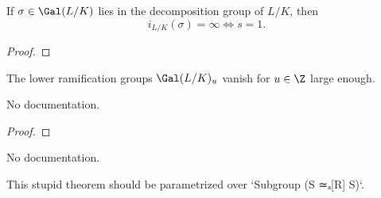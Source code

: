 \begin{theorem}
    \label{lowerIndex_ne_one}

\end{theorem}

\begin{theorem}
    \label{lowerIndex_eq_top_iff_eq_refl}
    \leanok
    If $\sigma\in\Gal(L/K)$ lies in the decomposition group of $L/K$, then \[i_{L/K}(\sigma) = \infty\iff s = 1.\]
\end{theorem}
\begin{proof}
    \leanok
\end{proof}

\begin{theorem}
    \label{exist_lowerRamificationGroup_eq_bot}
    \leanok
    The lower ramification groups $\Gal(L/K)_{u}$ vanish for $u\in\Z$ large enough. 
\end{theorem}





\begin{theorem}\label{Valuation.IsEquiv_comap_symm}
        \leanok
                No documentation.
    \end{theorem}

\begin{proof}
    \leanok
\end{proof}

\begin{definition}\label{Valued.decompositionGroup}
        \leanok
                No documentation.
    \end{definition}

\begin{theorem}\label{Valued.decompositionGroup_one}
        \leanok
                This stupid theorem should be parametrized over `Subgroup (S ≃ₐ[R] S)`.
    \end{theorem}

